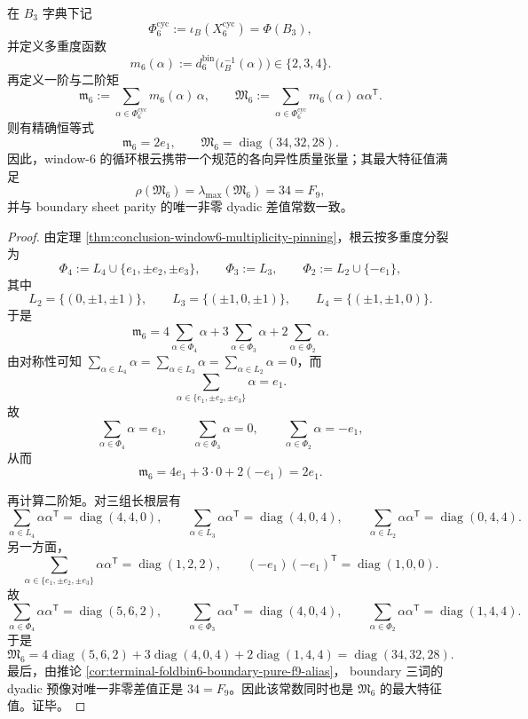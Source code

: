 \begin{theorem}[循环根云的各向异性质量向量与质量张量]\label{thm:conclusion-window6-weighted-root-cloud-moment-tensor}
在 \(B_3\) 字典下记
\[
\Phi_6^{\mathrm{cyc}}:=\iota_B(X_6^{\mathrm{cyc}})=\Phi(B_3),
\]
并定义多重度函数
\[
m_6(\alpha):=d_6^{\mathrm{bin}}\bigl(\iota_B^{-1}(\alpha)\bigr)\in\{2,3,4\}.
\]
再定义一阶与二阶矩
\[
\mathfrak m_6:=\sum_{\alpha\in\Phi_6^{\mathrm{cyc}}}m_6(\alpha)\,\alpha,
\qquad
\mathfrak M_6:=\sum_{\alpha\in\Phi_6^{\mathrm{cyc}}}m_6(\alpha)\,\alpha\alpha^{\mathsf T}.
\]
则有精确恒等式
\[
\mathfrak m_6=2e_1,
\qquad
\mathfrak M_6=\operatorname{diag}(34,32,28).
\]
因此，window-\(6\) 的循环根云携带一个规范的各向异性质量张量；其最大特征值满足
\[
\rho(\mathfrak M_6)=\lambda_{\max}(\mathfrak M_6)=34=F_9,
\]
并与 boundary sheet parity 的唯一非零 dyadic 差值常数一致。
\end{theorem}
\begin{proof}
由定理 \ref{thm:conclusion-window6-multiplicity-pinning}，根云按多重度分裂为
\[
\Phi_4:=L_4\cup\{e_1,\pm e_2,\pm e_3\},
\qquad
\Phi_3:=L_3,
\qquad
\Phi_2:=L_2\cup\{-e_1\},
\]
其中
\[
L_2=\{(0,\pm1,\pm1)\},
\qquad
L_3=\{(\pm1,0,\pm1)\},
\qquad
L_4=\{(\pm1,\pm1,0)\}.
\]
于是
\[
\mathfrak m_6
=
4\sum_{\alpha\in\Phi_4}\alpha
+3\sum_{\alpha\in\Phi_3}\alpha
+2\sum_{\alpha\in\Phi_2}\alpha.
\]
由对称性可知 \(\sum_{\alpha\in L_4}\alpha=\sum_{\alpha\in L_3}\alpha=\sum_{\alpha\in L_2}\alpha=0\)，而
\[
\sum_{\alpha\in\{e_1,\pm e_2,\pm e_3\}}\alpha=e_1.
\]
故
\[
\sum_{\alpha\in\Phi_4}\alpha=e_1,
\qquad
\sum_{\alpha\in\Phi_3}\alpha=0,
\qquad
\sum_{\alpha\in\Phi_2}\alpha=-e_1,
\]
从而
\[
\mathfrak m_6=4e_1+3\cdot 0+2(-e_1)=2e_1.
\]

再计算二阶矩。对三组长根层有
\[
\sum_{\alpha\in L_4}\alpha\alpha^{\mathsf T}=\operatorname{diag}(4,4,0),
\qquad
\sum_{\alpha\in L_3}\alpha\alpha^{\mathsf T}=\operatorname{diag}(4,0,4),
\qquad
\sum_{\alpha\in L_2}\alpha\alpha^{\mathsf T}=\operatorname{diag}(0,4,4).
\]
另一方面，
\[
\sum_{\alpha\in\{e_1,\pm e_2,\pm e_3\}}\alpha\alpha^{\mathsf T}
=
\operatorname{diag}(1,2,2),
\qquad
(-e_1)(-e_1)^{\mathsf T}
=
\operatorname{diag}(1,0,0).
\]
故
\[
\sum_{\alpha\in\Phi_4}\alpha\alpha^{\mathsf T}=\operatorname{diag}(5,6,2),
\qquad
\sum_{\alpha\in\Phi_3}\alpha\alpha^{\mathsf T}=\operatorname{diag}(4,0,4),
\qquad
\sum_{\alpha\in\Phi_2}\alpha\alpha^{\mathsf T}=\operatorname{diag}(1,4,4).
\]
于是
\[
\mathfrak M_6
=
4\operatorname{diag}(5,6,2)
+3\operatorname{diag}(4,0,4)
+2\operatorname{diag}(1,4,4)
=
\operatorname{diag}(34,32,28).
\]
最后，由推论 \ref{cor:terminal-foldbin6-boundary-pure-f9-alias}，
boundary 三词的 dyadic 预像对唯一非零差值正是 \(34=F_9\)。因此该常数同时也是 \(\mathfrak M_6\) 的最大特征值。证毕。
\end{proof}

